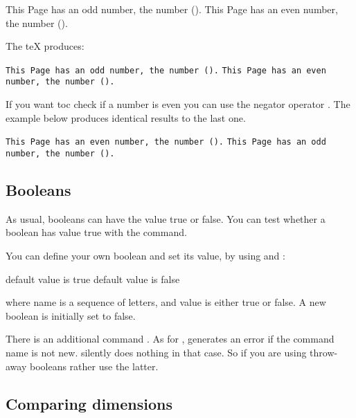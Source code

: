 \begin{teX}
\begin{teX}
\begin{teX}
\begin{teX}
\ifthenelse{\isodd{\thepage}}
   {This Page has an odd number, the number (\thepage).}
   {This Page has an even number, the number (\thepage).}
\end{teX}  

The  teX    produces:
\medskip

\ifthenelse{\isodd{\thepage}}
   {\texttt{This Page has an odd number, the number (\thepage).}}
   {\texttt{This Page has an even number, the number (\thepage).}}

If you want toc check if a number is even you can use the negator
operator . The example below produces identical results to the last one.

\begin{teX}
\ifthenelse{\NOT\isodd{\thepage}}
{\tt This Page has an even number, the number (\thepage).}
{\tt This Page has an odd number, the number (\thepage).}
\end{teX}

\subsection{Booleans}

As usual, booleans can have the value true or false. You can
test whether a boolean has value true with the  command.

\begin{teX}
\end{teX}

You can define your own boolean and set its value, by using
 and :

\begin{teX}

\ifthenelse{\isOdd}
  {default value is true}
  {default value is false}
\end{teX}

where name is a sequence of letters, and value is either true or
false. A new boolean is initially set to false.

There is an additional command .  As for ,  generates
an error if the command name is not new.  silently does nothing
in that case. So if you are using throw-away booleans rather use the latter.

\subsection{Comparing dimensions}


\end{teX}
\end{teX}
\end{teX}
